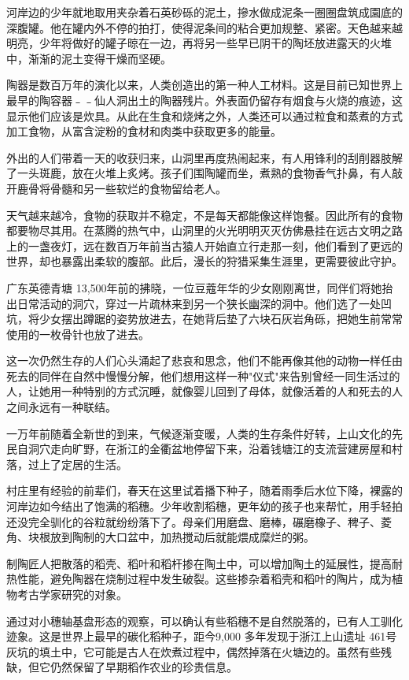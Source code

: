 河岸边的少年就地取用夹杂着石英砂砾的泥土，摻水做成泥条一圈圈盘筑成園底的深腹罐。他在罐内外不停的拍打，使得泥条间的粘合更加规整、紧密。天色越来越明亮，少年将做好的罐子晾在一边，再将另一些早已阴干的陶坯放进露天的火堆中，渐渐的泥土变得干燥而坚硬。

陶器是数百万年的演化以来，人类创造出的第一种人工材料。这是目前已知世界上最早的陶容器﹣﹣仙人洞出土的陶器残片。外表面仍留存有烟食与火烧的痕迹，这显示他们应该是炊具。从此在生食和烧烤之外，人类还可以通过粒食和蒸煮的方式加工食物，从富含淀粉的食材和肉类中获取更多的能量。

外出的人们带着一天的收获归来，山洞里再度热闹起来，有人用锋利的刮削器肢解了一头斑鹿，放在火堆上炙烤。孩子们围陶罐而坐，煮熟的食物香气扑鼻，有人敲开鹿骨将骨髓和另一些软烂的食物留给老人。

天气越来越冷，食物的获取并不稳定，不是每天都能像这样饱餐。因此所有的食物都要物尽其用。在蒸腾的热气中，山洞里的火光明明灭灭仿佛悬挂在远古文明之路上的一盏夜灯，远在数百万年前当古猿人开始直立行走那一刻，他们看到了更远的世界，却也暴露出柔软的腹部。此后，漫长的狩猎采集生涯里，更需要彼此守护。

广东英德青塘 13,500年前的拂晓，一位豆蔻年华的少女刚刚离世，同伴们将她抬出日常活动的洞穴，穿过一片疏林来到另一个狭长幽深的洞中。他们选了一处凹坑，将少女摆出蹲踞的姿势放进去，在她背后垫了六块石灰岩角砾，把她生前常常使用的一枚骨针也放了进去。

这一次仍然生存的人们心头涌起了悲哀和思念，他们不能再像其他的动物一样任由死去的同伴在自然中慢慢分解，他们想用这样一种"仪式"来告别曾经一同生活过的人，让她用一种特别的方式沉睡，就像婴儿回到了母体，就像活着的人和死去的人之间永远有一种联结。

一万年前随着全新世的到来，气候逐渐变暖，人类的生存条件好转，上山文化的先民自洞穴走向旷野，在浙江的金衢盆地停留下来，沿着钱塘江的支流营建房屋和村落，过上了定居的生活。

村庄里有经验的前辈们，春天在这里试着播下种子，随着雨季后水位下降，裸露的河岸边如今结出了饱满的稻穗。少年收割稻穗，更年幼的孩子也来帮忙，用手轻拍还没完全驯化的谷粒就纷纷落下了。母亲们用磨盘、磨棒，碾磨橡子、稗子、菱角、块根放到陶制的大口盆中，加热搅动后就能煨成糜烂的粥。

制陶匠人把散落的稻壳、稻叶和稻杆掺在陶土中，可以增加陶土的延展性，提高耐热性能，避免陶器在烧制过程中发生破裂。这些掺杂着稻壳和稻叶的陶片，成为植物考古学家研究的对象。

通过对小穗轴基盘形态的观察，可以确认有些稻穗不是自然脱落的，已有人工驯化迹象。这是世界上最早的碳化稻种子，距今9,000 多年发现于浙江上山遗址 461号灰坑的填土中，它可能是古人在炊煮过程中，偶然掉落在火塘边的。虽然有些残缺，但它仍然保留了早期稻作农业的珍贵信息。

